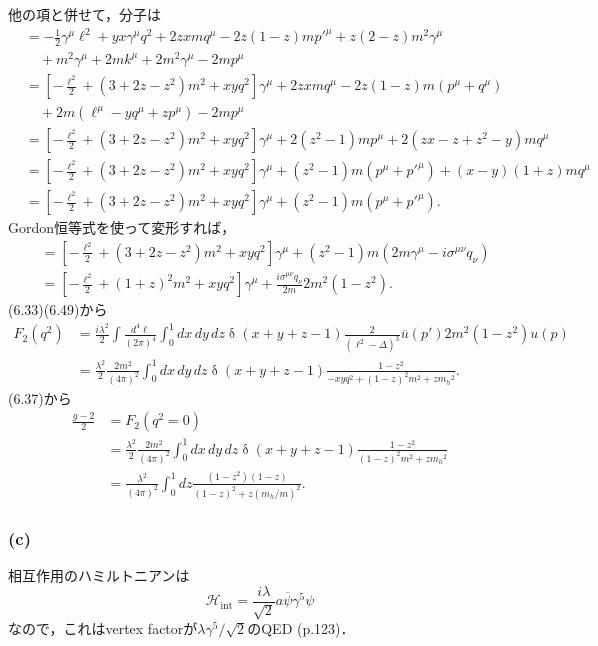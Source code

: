 他の項と併せて，分子は
\begin{align*}
  &= -\frac{1}{2} \gamma^\mu \ell^2 + yx \gamma^\mu q^2 + 2zx m q^\mu - 2z(1-z) m p'^\mu + z(2-z)m^2 \gamma^\mu \\
  & \quad + m^2 \gamma^\mu + 2mk^\mu + 2m^2 \gamma^\mu - 2mp^\mu \\
  &= \left[ -\frac{\ell^2}{2} + (3+2z-z^2) m^2 + xy q^2 \right] \gamma^\mu + 2zx m q^\mu - 2z(1-z) m (p^\mu + q^\mu) \\
  & \quad + 2m(\ell^\mu - yq^\mu + zp^\mu) - 2mp^\mu \\
  &= \left[ -\frac{\ell^2}{2} + (3+2z-z^2) m^2 + xy q^2 \right] \gamma^\mu + 2(z^2 - 1) mp^\mu + 2 (zx - z + z^2 - y) mq^\mu \\
  &= \left[ -\frac{\ell^2}{2} + (3+2z-z^2) m^2 + xy q^2 \right] \gamma^\mu + (z^2 - 1) m (p^\mu + p'^\mu) + (x-y)(1+z) mq^\mu \\
  &= \left[ -\frac{\ell^2}{2} + (3+2z-z^2) m^2 + xy q^2 \right] \gamma^\mu + (z^2 - 1) m (p^\mu + p'^\mu) .
\end{align*}
Gordon恒等式を使って変形すれば，
\begin{align*}
  &= \left[ -\frac{\ell^2}{2} + (3+2z-z^2) m^2 + xy q^2 \right] \gamma^\mu + (z^2 - 1) m (2m\gamma^\mu - i \sigma^{\mu\nu}q_\nu) \\
  &= \left[ -\frac{\ell^2}{2} + (1+z)^2 m^2 + xy q^2 \right] \gamma^\mu + \frac{i \sigma^{\mu\nu}q_\nu}{2m} 2m^2 (1 - z^2) .
\end{align*}
(6.33)(6.49)から
\begin{align*}
  F_2(q^2) &= \frac{i\lambda^2}{2} \int \frac{d^4\ell}{(2\pi)^4} \int_0^1 dx \, dy \, dz  \mathop\delta(x+y+z-1) \frac{2}{(\ell^2 - \Delta)^3} \overline{u}(p') 2m^2 (1 - z^2) u(p) \\
  &= \frac{\lambda^2}{2} \frac{2m^2}{(4\pi)^2}  \int_0^1 dx \, dy \, dz  \mathop\delta(x+y+z-1) \frac{1 - z^2}{-xyq^2 + (1-z)^2 m^2 +zm_h{}^2} .
\end{align*}
(6.37)から
\begin{align*}
  \frac{g-2}{2} &=  F_2(q^2=0) \\
   &= \frac{\lambda^2}{2} \frac{2m^2}{(4\pi)^2}  \int_0^1 dx \, dy \, dz  \mathop\delta(x+y+z-1) \frac{1 - z^2}{(1-z)^2 m^2 +zm_h{}^2} \\
  &= \frac{\lambda^2}{(4\pi)^2} \int_0^1 dz \frac{(1 - z^2)(1-z)}{(1-z)^2  +z(m_h/m)^2} .
\end{align*}

\subsubsection{(c)}
相互作用のハミルトニアンは
\[ \mathcal{H}_\text{int} = \frac{i\lambda}{\sqrt{2}} a \overline\psi \gamma^5 \psi \]
なので，これはvertex factorが$\lambda \gamma^5/\sqrt{2}$のQED (p.123)．

